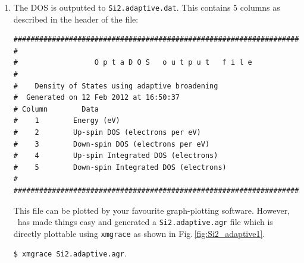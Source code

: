 \documentclass[a4paper,11pt,twoside]{book}
\begin{document}
{\begin{enumerate}
Importantly, then \optados\ calculates the band energy from the DOS is has calculated.
\begin{verbatim}
+--------------------------- Band Energy Analysis ----------------------------+
|          Band energy (Adaptive broadening) :       1.3609 eV         <- BEA |
|                  Band energy (From CASTEP) :       1.3622 eV         <- BEC |
+-----------------------------------------------------------------------------+
\end{verbatim}
As the quality of the \optados\ calculation is increased these two values should converge to the same answer.

Finally \optados\ shifts the Fermi level to 0\,eV, for the output files.

\item  The DOS is outputted to {\tt Si2.adaptive.dat}. This contains 5 columns as described in the header of the file:
\begin{verbatim}
########################################################################
#
#                  O p t a D O S   o u t p u t   f i l e
#
#    Density of States using adaptive broadening
#  Generated on 12 Feb 2012 at 16:50:37
# Column        Data
#    1        Energy (eV)
#    2        Up-spin DOS (electrons per eV)
#    3        Down-spin DOS (electrons per eV)
#    4        Up-spin Integrated DOS (electrons)
#    5        Down-spin Integrated DOS (electrons)
#
########################################################################
\end{verbatim}

This file can be plotted by your favourite graph-plotting software. However, \optados\ has made things easy and generated a  {\tt Si2.adaptive.agr} file which is directly plottable using \verb#xmgrace# as shown in Fig.\,\ref{fig:Si2_adaptive1}.

\verb#$ xmgrace Si2.adaptive.agr#.


\end{enumerate}}
\end{document}

